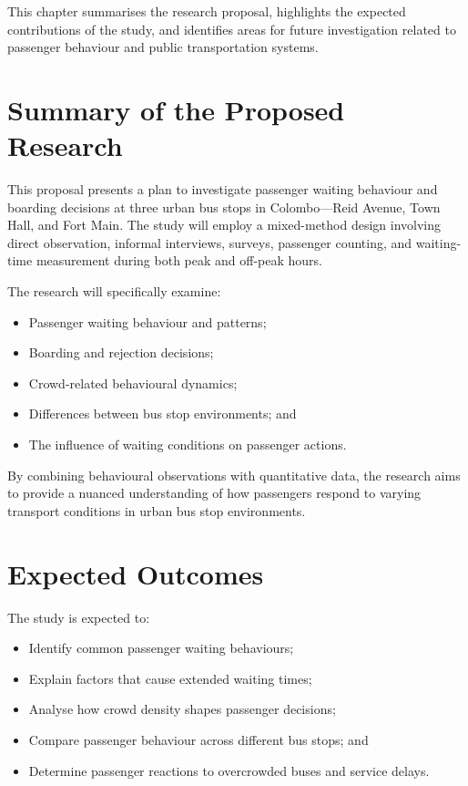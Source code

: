 \documentclass[12pt, a4paper]{report}
\begin{document}
This chapter summarises the research proposal, highlights the expected contributions of the
study, and identifies areas for future investigation related to passenger behaviour and public
transportation systems.

\section{Summary of the Proposed Research}

This proposal presents a plan to investigate passenger waiting behaviour and boarding
decisions at three urban bus stops in Colombo—Reid Avenue, Town Hall, and Fort Main. The
study will employ a mixed-method design involving direct observation, informal interviews,
surveys, passenger counting, and waiting-time measurement during both peak and off-peak
hours.

The research will specifically examine:

\begin{itemize}[noitemsep]
    \item Passenger waiting behaviour and patterns;
    \item Boarding and rejection decisions;
    \item Crowd-related behavioural dynamics;
    \item Differences between bus stop environments; and
    \item The influence of waiting conditions on passenger actions.
\end{itemize}

By combining behavioural observations with quantitative data, the research aims to provide
a nuanced understanding of how passengers respond to varying transport conditions in urban
bus stop environments.

\section{Expected Outcomes}

The study is expected to:

\begin{itemize}[noitemsep]
    \item Identify common passenger waiting behaviours;
    \item Explain factors that cause extended waiting times;
    \item Analyse how crowd density shapes passenger decisions;
    \item Compare passenger behaviour across different bus stops; and
    \item Determine passenger reactions to overcrowded buses and service delays.
\end{itemize}
\end{document}
